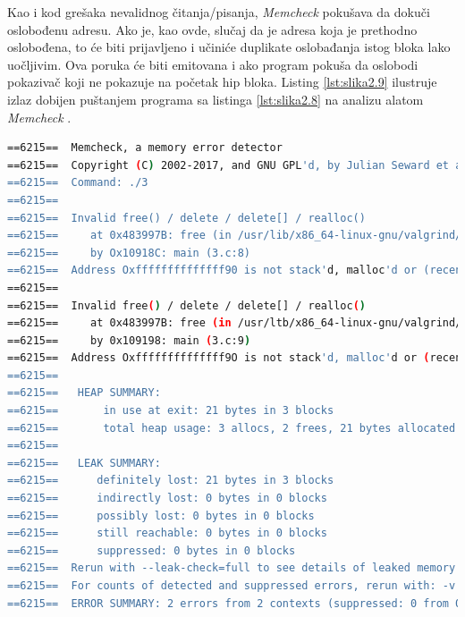 \documentclass[12pt,oneside]{memoir}
\theoremstyle{plain}
\theoremstyle{definition}
\begin{document}

Kao i kod grešaka nevalidnog čitanja/pisanja, \textit{Memcheck} pokušava da dokuči oslobođenu adresu. Ako je, kao ovde, slučaj da je adresa koja je prethodno oslobođena, to će biti prijavljeno i učiniće duplikate oslobađanja istog bloka lako uočljivim. Ova poruka će biti emitovana i ako program pokuša da oslobodi pokazivač koji ne pokazuje na početak hip bloka. Listing \ref{lst:slika2.9} ilustruje izlaz dobijen puštanjem programa sa listinga \ref{lst:slika2.8} na analizu alatom \textit{Memcheck} \cite{ValgrindDOC}. 


\begin{lstlisting}[style=terminal,caption={Primer ispisa greške nedopuštenog oslobađanja memorije}, label={lst:slika2.9},language={bash}] 
==6215==  Memcheck, a memory error detector
==6215==  Copyright (C) 2002-2017, and GNU GPL'd, by Julian Seward et al. Using Valgrind-3.14.0 and LibVEX; rerun with -h for copyright info 
==6215==  Command: ./3
==6215== 
==6215==  Invalid free() / delete / delete[] / realloc()
==6215==     at 0x483997B: free (in /usr/lib/x86_64-linux-gnu/valgrind/vgpreload_memcheck-amd64-linux.so) 
==6215==     by Ox10918C: main (3.c:8)
==6215==  Address Oxffffffffffffff90 is not stack'd, malloc'd or (recently) free'd
==6215== 
==6215==  Invalid free() / delete / delete[] / realloc()
==6215==     at 0x483997B: free (in /usr/ltb/x86_64-linux-gnu/valgrind/vgpreload_memcheck-amd64-linux.so) 
==6215==     by 0x109198: main (3.c:9)
==6215==  Address Oxffffffffffffff9O is not stack'd, malloc'd or (recently) free'd
==6215== 
==6215==   HEAP SUMMARY:
==6215==       in use at exit: 21 bytes in 3 blocks
==6215==       total heap usage: 3 allocs, 2 frees, 21 bytes allocated
==6215== 
==6215==   LEAK SUMMARY:
==6215==      definitely lost: 21 bytes in 3 blocks 
==6215==      indirectly lost: 0 bytes in 0 blocks
==6215==      possibly lost: 0 bytes in 0 blocks 
==6215==      still reachable: 0 bytes in 0 blocks
==6215==      suppressed: 0 bytes in 0 blocks
==6215==  Rerun with --leak-check=full to see details of leaked memory
==6215==  For counts of detected and suppressed errors, rerun with: -v 
==6215==  ERROR SUMMARY: 2 errors from 2 contexts (suppressed: 0 from 0)
\end{lstlisting}
\end{document}
